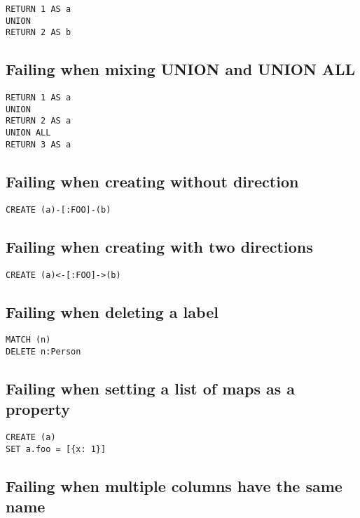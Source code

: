 \begin{lstlisting}
RETURN 1 AS a
UNION
RETURN 2 AS b
\end{lstlisting}

\subsection{Failing when mixing UNION and UNION ALL}

\begin{lstlisting}
RETURN 1 AS a
UNION
RETURN 2 AS a
UNION ALL
RETURN 3 AS a
\end{lstlisting}

\subsection{Failing when creating without direction}

\begin{lstlisting}
CREATE (a)-[:FOO]-(b)
\end{lstlisting}

\subsection{Failing when creating with two directions}

\begin{lstlisting}
CREATE (a)<-[:FOO]->(b)
\end{lstlisting}

\subsection{Failing when deleting a label}

\begin{lstlisting}
MATCH (n)
DELETE n:Person
\end{lstlisting}

\subsection{Failing when setting a list of maps as a property}

\begin{lstlisting}
CREATE (a)
SET a.foo = [{x: 1}]
\end{lstlisting}

\subsection{Failing when multiple columns have the same name}

